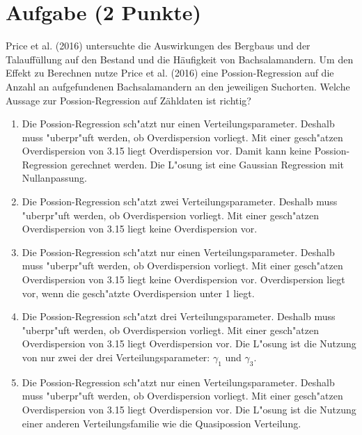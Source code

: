 \documentclass[a4paper, 10pt]{scrartcl}\usepackage[]{graphicx}\usepackage[]{xcolor}
\begin{document}
\section{Aufgabe \hfill (2 Punkte)}

Price et al. (2016) untersuchte die Auswirkungen des Bergbaus und der
Talauff{\"u}llung auf den Bestand und die H{\"a}ufigkeit von Bachsalamandern. Um
den Effekt zu Berechnen nutze Price et al. (2016) eine Possion-Regression
auf die Anzahl an aufgefundenen Bachsalamandern an den jeweiligen
Suchorten. Welche Aussage zur Possion-Regression auf Z{\"a}hldaten ist richtig?






\begin{enumerate}
\item [\textbf{A} \msquare] Die Possion-Regression sch{"a}tzt nur einen Verteilungsparameter. Deshalb muss {"u}berpr{"u}ft werden, ob Overdispersion vorliegt. Mit einer gesch{"a}tzen Overdispersion von 3.15 liegt Overdispersion vor. Damit kann keine Possion-Regression gerechnet werden. Die L{"o}sung ist eine Gaussian Regression mit Nullanpassung.
\item [\textbf{B} \msquare] Die Possion-Regression sch{"a}tzt zwei Verteilungsparameter. Deshalb muss {"u}berpr{"u}ft werden, ob Overdispersion vorliegt. Mit einer gesch{"a}tzen Overdispersion von 3.15 liegt keine Overdispersion vor.
\item [\textbf{C} \msquare] Die Possion-Regression sch{"a}tzt nur einen Verteilungsparameter. Deshalb muss {"u}berpr{"u}ft werden, ob Overdispersion vorliegt. Mit einer gesch{"a}tzen Overdispersion von 3.15 liegt keine Overdispersion vor. Overdispersion liegt vor, wenn die gesch{"a}tzte Overdispersion unter 1 liegt.
\item [\textbf{D} \msquare] Die Possion-Regression sch{"a}tzt drei Verteilungsparameter. Deshalb muss {"u}berpr{"u}ft werden, ob Overdispersion vorliegt. Mit einer gesch{"a}tzen Overdispersion von 3.15 liegt Overdispersion vor. Die L{"o}sung ist die Nutzung von nur zwei der drei Verteilungsparameter: $\gamma_1$ und $\gamma_3$.
\item [\textbf{E} \msquare] Die Possion-Regression sch{"a}tzt nur einen Verteilungsparameter. Deshalb muss {"u}berpr{"u}ft werden, ob Overdispersion vorliegt. Mit einer gesch{"a}tzen Overdispersion von 3.15 liegt Overdispersion vor. Die L{"o}sung ist die Nutzung einer anderen Verteilungsfamilie wie die Quasipossion Verteilung.
\end{enumerate}
\end{document}
